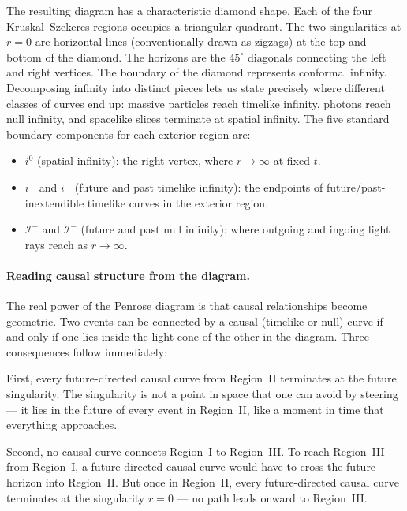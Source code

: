 The resulting diagram has a characteristic diamond shape.  Each of the
four Kruskal--Szekeres regions occupies a triangular quadrant.  The two
singularities at $r = 0$ are horizontal lines (conventionally drawn as
zigzags) at the top and bottom of the diamond.  The horizons are the
$45^\circ$ diagonals connecting the left and right vertices.  The
boundary of the diamond represents conformal infinity.  Decomposing
infinity into distinct pieces lets us state precisely where different
classes of curves end up: massive particles reach timelike infinity,
photons reach null infinity, and spacelike slices terminate at spatial
infinity.  The five standard boundary components for each exterior
region are:
%
\begin{itemize}
  \item $i^0$ (spatial infinity): the right vertex, where $r \to \infty$
    at fixed $t$.
  \item $i^+$ and $i^-$ (future and past timelike infinity): the
    endpoints of future/past-inextendible timelike curves in the
    exterior region.
  \item $\mathscr{I}^+$ and $\mathscr{I}^-$ (future and past null
    infinity): where outgoing and ingoing light rays reach as
    $r \to \infty$.
\end{itemize}

\paragraph{Reading causal structure from the diagram.}

The real power of the Penrose diagram is that causal relationships
become geometric.  Two events can be connected by a causal (timelike or
null) curve if and only if one lies inside the light cone of the other
in the diagram.  Three consequences follow immediately:

First, every future-directed causal curve from Region~II terminates at
the future singularity.  The singularity is not a point in space that
one can avoid by steering --- it lies in the future of every event in
Region~II, like a moment in time that everything approaches.

Second, no causal curve connects Region~I to Region~III.  To reach
Region~III from Region~I, a future-directed causal curve would have to
cross the future horizon into Region~II.  But once in Region~II, every
future-directed causal curve terminates at the singularity $r = 0$ ---
no path leads onward to Region~III.

